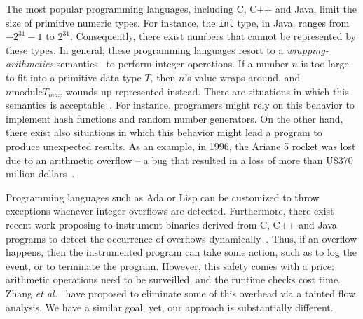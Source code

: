 \documentclass[preprint]{sigplanconf}[10pt]
\begin{document}
The most popular programming languages, including C, C++ and Java, limit the
size of primitive numeric types.
For instance, the \texttt{int} type, in Java, ranges from $-2^{31}-1$ to
$2^{31}$.
Consequently, there exist numbers that cannot be represented by these types.
In general, these programming languages resort to a {\em wrapping-arithmetics}
semantics~\cite{TODO} to perform integer operations.
If a number $n$ is too large to fit into a primitive data type $T$, then $n$'s
value wraps around, and $n \mbox{module} T_{max}$ wounds up represented
instead.
There are situations in which this semantics is acceptable~\cite{TODO}.
For instance, programers might rely on this behavior to implement hash functions
and random number generators.
On the other hand, there exist also situations in which this behavior might
lead a program to produce unexpected results.
As an example, in 1996, the Ariane 5 rocket was lost due to an arithmetic
overflow -- a bug that resulted in a loss of more than U\$370 million
dollars~\cite{Dowson97}.

Programming languages such as Ada or Lisp can be customized to throw exceptions
whenever integer overflows are detected.
Furthermore, there exist recent work proposing to instrument binaries derived
from C, C++ and Java programs to detect the occurrence of overflows
dynamically~\cite{Brumley07,Dietz12}.
Thus, if an overflow happens, then the instrumented program can take some
action, such as to log the event, or to terminate the program.
However, this safety comes with a price: arithmetic operations need to be
surveilled, and the runtime checks cost time.
Zhang {\em et al.}~\cite{Zhang09} have proposed to eliminate some of this
overhead via a tainted flow analysis.
We have a similar goal, yet, our approach is substantially different.
\end{document}

